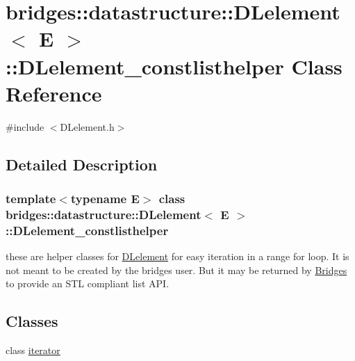 \hypertarget{classbridges_1_1datastructure_1_1_d_lelement_1_1_d_lelement__constlisthelper}{}\section{bridges\+:\+:datastructure\+:\+:D\+Lelement$<$ E $>$\+:\+:D\+Lelement\+\_\+constlisthelper Class Reference}
\label{classbridges_1_1datastructure_1_1_d_lelement_1_1_d_lelement__constlisthelper}


{\ttfamily \#include $<$D\+Lelement.\+h$>$}



\subsection{Detailed Description}
\subsubsection*{template$<$typename E$>$\newline
class bridges\+::datastructure\+::\+D\+Lelement$<$ E $>$\+::\+D\+Lelement\+\_\+constlisthelper}

these are helper classes for \hyperlink{classbridges_1_1datastructure_1_1_d_lelement}{D\+Lelement} for easy iteration in a range for loop. It is not meant to be created by the bridges user. But it may be returned by \hyperlink{classbridges_1_1_bridges}{Bridges} to provide an S\+TL compliant list A\+PI. \subsection*{Classes}
\begin{DoxyCompactItemize}
\item 
class \hyperlink{classbridges_1_1datastructure_1_1_d_lelement_1_1_d_lelement__constlisthelper_1_1iterator}{iterator}
\end{DoxyCompactItemize}
